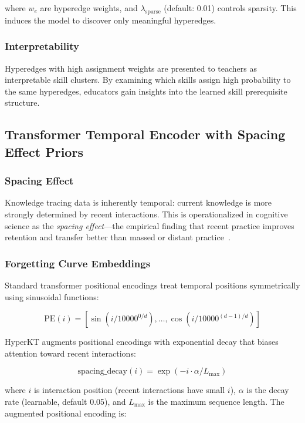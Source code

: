 \documentclass[10pt,twocolumn]{article}
\begin{document}
where $w_e$ are hyperedge weights, and $\lambda_{\text{sparse}}$ (default: 0.01) controls sparsity. This induces the model to discover only meaningful hyperedges.

\subsubsection{Interpretability}
Hyperedges with high assignment weights are presented to teachers as interpretable skill clusters. By examining which skills assign high probability to the same hyperedges, educators gain insights into the learned skill prerequisite structure.

\subsection{Transformer Temporal Encoder with Spacing Effect Priors}

\subsubsection{Spacing Effect}
Knowledge tracing data is inherently temporal: current knowledge is more strongly determined by recent interactions. This is operationalized in cognitive science as the \textit{spacing effect}—the empirical finding that recent practice improves retention and transfer better than massed or distant practice~\cite{cepeda2006}.

\subsubsection{Forgetting Curve Embeddings}
Standard transformer positional encodings treat temporal positions symmetrically using sinusoidal functions:

\begin{equation}
\text{PE}(i) = [\sin(i/10000^{0/d}), \ldots, \cos(i/10000^{(d-1)/d})]
\end{equation}

HyperKT augments positional encodings with exponential decay that biases attention toward recent interactions:

\begin{equation}
\text{spacing\_decay}(i) = \exp(-i \cdot \alpha / L_{\max})
\end{equation}

where $i$ is interaction position (recent interactions have small $i$), $\alpha$ is the decay rate (learnable, default 0.05), and $L_{\max}$ is the maximum sequence length. The augmented positional encoding is:
\end{document}
